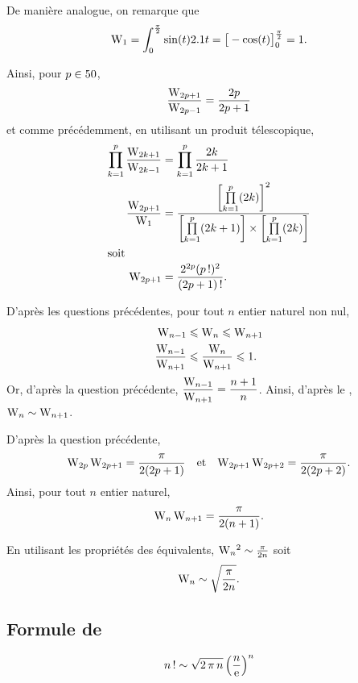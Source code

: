 \begin{solution}
\begin{reponses}
\item De manière analogue, on remarque que
\[
\mathrm{W}_1
= \int_0^{\frac{\pi}{2}} \sin(t) 2.1 t
= \big[-\cos(t)\big]_0^{\frac{\pi}{2}}
= 1.
\]

Ainsi, pour $p \in 50$,
\[
\frac{\mathrm{W}_{2p+1}}{\mathrm{W}_{2p-1}} = \frac{2p}{2p+1}
\]
et comme précédemment, en utilisant un produit télescopique, 
\begin{align*}
\prod_{k=1}^p \frac{\mathrm{W}_{2k+1}}{\mathrm{W}_{2k-1}} &= \prod_{k=1}^p \frac{2k}{2k+1}\\
\frac{\mathrm{W}_{2p+1}}{\mathrm{W}_1} &= \frac{\left[\prod\limits_{k=1}^p (2k)\right]^2}{\left[\prod\limits_{k=1}^p (2k+1)\right] \times \left[\prod\limits_{k=1}^p (2k)\right]}\\
\intertext{soit}
\mathrm{W}_{2p+1} &= \frac{2^{2p} (p\,!)^2}{(2p+1)\,!}.
\end{align*}

\item D'après les questions précédentes, pour tout $n$ entier naturel non nul,
\begin{align*}
\mathrm{W}_{n-1} &\leqslant \mathrm{W}_n \leqslant \mathrm{W}_{n+1}\\
\frac{\mathrm{W}_{n-1}}{\mathrm{W}_{n+1}} &\leqslant \frac{\mathrm{W}_n}{\mathrm{W}_{n+1}} \leqslant 1.
\end{align*}
Or, d'après la question précédente, $\displaystyle \frac{\mathrm{W}_{n-1}}{\mathrm{W}_{n+1}} = \frac{n+1}{n}$. Ainsi, d'après le , $\mathrm{W}_n \sim \mathrm{W}_{n+1}$.

\item D'après la question précédente,
\[
\mathrm{W}_{2p} \, \mathrm{W}_{2p+1} = \frac{\pi}{2 (2 p + 1)}
\quad \text{et} \quad
\mathrm{W}_{2p+1} \, \mathrm{W}_{2p+2} = \frac{\pi}{2 (2p+2)}.
\]
Ainsi, pour tout $n$ entier naturel,
\[
\mathrm{W}_n \, \mathrm{W}_{n+1} = \frac{\pi}{2 (n + 1)}.
\]

\item En utilisant les propriétés des équivalents, $\mathrm{W}_n{}^2 \sim \frac{\pi}{2 n}$ soit
\[
\mathrm{W}_n \sim \sqrt{\frac{\pi}{2 n}}.
\]
\end{reponses}
\end{solution}

\subsection{Formule de } \label{preuve_stirling}

\begin{theo}
\[
n\,! \sim \sqrt{2 \, \pi \, n} \left(\frac{n}{\mathrm{e}}\right)^n
\]
\end{theo}

